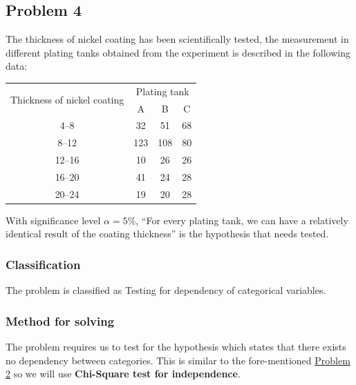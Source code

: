 \documentclass[a4paper]{article}
\numberwithin{equation}{section}
\begin{document}
\subsection{Problem 4}
The thickness of nickel coating has been scientifically tested, the measurement in different plating tanks obtained from the experiment is described in the following data:
\begin{center}
  \begin{tabular}{cccc}
    \toprule
    \multirow{2}{*}{Thickness of nickel coating} & \multicolumn{3}{c}{Plating tank}            \\
    \cmidrule(lr){2-4}
                                                 & A                                & B   & C  \\
    \midrule
    4--8                                         & 32                               & 51  & 68 \\
    8--12                                        & 123                              & 108 & 80 \\
    12--16                                       & 10                               & 26  & 26 \\
    16--20                                       & 41                               & 24  & 28 \\
    20--24                                       & 19                               & 20  & 28 \\
    \bottomrule
  \end{tabular}
\end{center}

With significance level \( \alpha = 5\% \), ``For every plating tank, we can have a relatively identical result of the coating thickness'' is the hypothesis that needs tested.

\subsubsection{Classification}
The problem is classified as Testing for dependency of categorical variables.

\subsubsection{Method for solving}
The problem requires us to test for the hypothesis which states that there exists no dependency between categories. This is similar to the fore-mentioned \hyperref[p2]{\underline{Problem 2}} so we will use \textbf{Chi-Square test for independence}.
\end{document}
